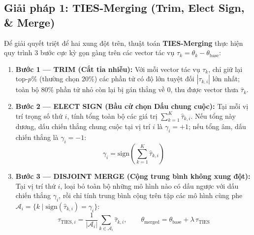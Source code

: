 \subsection{Giải pháp 1: TIES-Merging (Trim, Elect Sign, \& Merge) \citep{yadav2023ties}}

Để giải quyết triệt để hai xung đột trên, thuật toán \textbf{TIES-Merging} \citep{yadav2023ties} thực hiện quy trình 3 bước cực kỳ gọn gàng trên các vector tác vụ $\tau_k = \theta_k - \theta_{\text{base}}$:

\begin{enumerate}
  \item \textbf{Bước 1 --- TRIM (Cắt tỉa nhiễu):} Với mỗi vector tác vụ $\tau_k$, chỉ giữ lại top-$p\%$ (thường chọn $20\%$) các phần tử có độ lớn tuyệt đối $|\tau_{k,i}|$ lớn nhất; toàn bộ $80\%$ phần tử nhỏ còn lại bị gán thẳng về $0$, thu được vector thưa $\hat{\tau}_k$.
  \item \textbf{Bước 2 --- ELECT SIGN (Bầu cử chọn Dấu chung cuộc):} Tại mỗi vị trí trọng số thứ $i$, tính tổng toàn bộ các giá trị $\sum_{k=1}^K \hat{\tau}_{k,i}$. Nếu tổng này dương, dấu chiến thắng chung cuộc tại vị trí $i$ là $\gamma_i = +1$; nếu tổng âm, dấu chiến thắng là $\gamma_i = -1$:
  \begin{equation}
    \gamma_i = \text{sign}\left( \sum_{k=1}^{K} \hat{\tau}_{k, i} \right)
  \end{equation}
  \item \textbf{Bước 3 --- DISJOINT MERGE (Cộng trung bình không xung đột):} Tại vị trí thứ $i$, loại bỏ toàn bộ những mô hình nào có dấu ngược với dấu chiến thắng $\gamma_i$, rồi chỉ tính trung bình cộng trên tập các mô hình cùng phe $\mathcal{A}_i = \{k \mid \text{sign}(\hat{\tau}_{k,i}) = \gamma_i\}$:
  \begin{equation}
    \tau_{\text{TIES}, i} = \frac{1}{|\mathcal{A}_i|} \sum_{k \in \mathcal{A}_i} \hat{\tau}_{k, i}, \qquad \theta_{\text{merged}} = \theta_{\text{base}} + \lambda \, \tau_{\text{TIES}}
    \label{eq:ties_merge}
  \end{equation}
\end{enumerate}

